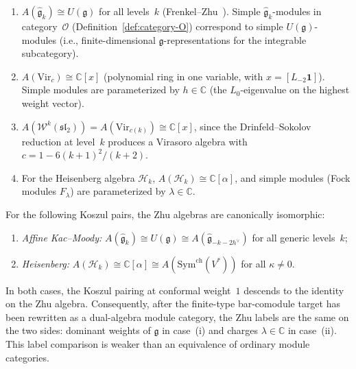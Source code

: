 \begin{example}\label{ex:zhu-algebras}
\leavevmode
\begin{enumerate}[label=(\roman*)]
\item $A(\widehat{\mathfrak{g}}_k) \cong U(\mathfrak{g})$
 for all levels~$k$
 (Frenkel--Zhu~\cite{FZ92}). Simple
 $\widehat{\mathfrak{g}}_k$\nobreakdash-modules
 in category~$\mathcal{O}$
 (Definition~\ref{def:category-O}) correspond to
 simple $U(\mathfrak{g})$-modules (i.e.,
 finite-dimensional $\mathfrak{g}$-representations for
 the integrable subcategory).
\item $A(\mathrm{Vir}_c) \cong \mathbb{C}[x]$ \cite{FZ92} (polynomial ring in one
 variable, with $x = [L_{-2}\mathbf{1}]$). Simple modules are
 parameterized by $h \in \mathbb{C}$ (the $L_0$-eigenvalue on the
 highest weight vector).
\item $A(\mathcal{W}^k(\mathfrak{sl}_2)) = A(\mathrm{Vir}_{c(k)}) \cong
 \mathbb{C}[x]$, since the Drinfeld--Sokolov reduction at level~$k$
 produces a Virasoro algebra with $c = 1 - 6(k+1)^2/(k+2)$.
\item For the Heisenberg algebra $\mathcal{H}_k$,
 $A(\mathcal{H}_k) \cong \mathbb{C}[\alpha]$, and simple
 modules (Fock modules $F_\lambda$) are parameterized by
 $\lambda \in \mathbb{C}$.
\end{enumerate}
\end{example}

\begin{proposition}
\label{prop:zhu-koszul-compatibility}
For the following Koszul pairs, the Zhu algebras are canonically
isomorphic:
\begin{enumerate}[label=\textup{(\roman*)}]
\item \emph{Affine Kac--Moody:}
 $A(\widehat{\mathfrak{g}}_k) \cong U(\mathfrak{g})
 \cong A(\widehat{\mathfrak{g}}_{-k-2h^\vee})$
 for all generic levels~$k$;
\item \emph{Heisenberg:}
 $A(\mathcal{H}_k) \cong \mathbb{C}[\alpha]
 \cong A(\mathrm{Sym}^{\mathrm{ch}}(V^*))$
 for all $\kappa \neq 0$.
\end{enumerate}
In both cases, the Koszul pairing at conformal weight~$1$ descends to
the identity on the Zhu algebra. Consequently, after the finite-type
bar-comodule target has been rewritten as a dual-algebra module
category, the Zhu labels are the same on the two sides: dominant
weights of $\mathfrak{g}$ in case~\textup{(i)} and charges
$\lambda \in \mathbb{C}$ in case~\textup{(ii)}. This label comparison
is weaker than an equivalence of ordinary module categories.
\end{proposition}


